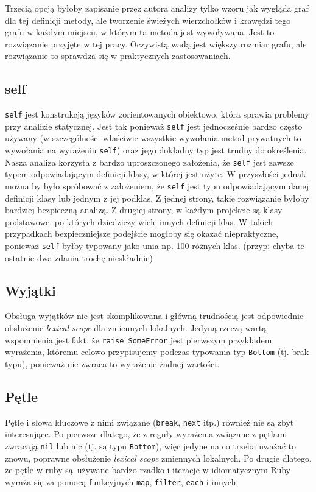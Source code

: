 \documentclass[declaration,shortabstract]{iithesis}
\begin{document}
Trzecią opcją byłoby zapisanie przez autora analizy tylko wzoru jak wygląda graf dla tej definicji metody, ale tworzenie świeżych wierzchołków i krawędzi tego grafu w każdym miejscu, w którym ta metoda jest wywoływana. Jest to rozwiązanie przyjęte w tej pracy. Oczywistą wadą jest większy rozmiar grafu, ale rozwiązanie to sprawdza się w praktycznych zastosowaniach.

\subsection{self}

\texttt{self} jest konstrukcją języków zorientowanych obiektowo, która sprawia problemy przy analizie statycznej.
Jest tak ponieważ \texttt{self} jest jednocześnie bardzo często używany (w szczególności właściwie wszystkie wywołania metod prywatnych to wywołania na wyrażeniu \texttt{self}) oraz jego dokładny typ jest trudny do określenia. Nasza analiza korzysta z bardzo uproszczonego założenia, że \texttt{self} jest zawsze typem odpowiadającym definicji klasy, w której jest użyte. W przyszłości jednak można by było spróbować z założeniem, że \texttt{self} jest typu odpowiadającym danej definicji klasy lub jednym z jej podklas. Z jednej strony, takie rozwiązanie byłoby bardziej bezpieczną analizą. Z drugiej strony, w każdym projekcie są klasy podstawowe, po których dziedziczy wiele innych definicji klas. W takich przypadkach bezpieczniejsze podejście mogłoby się okazać niepraktyczne, ponieważ \texttt{self} byłby typowany jako unia np. 100 różnych klas. (przyp: chyba te ostatnie dwa zdania trochę nieskładnie)

\subsection{Wyjątki}

Obsługa wyjątków nie jest skomplikowana i główną trudnością jest odpowiednie obsłużenie \textit{lexical scope} dla zmiennych lokalnych. Jedyną rzeczą wartą wspomnienia jest fakt, że \texttt{raise SomeError} jest pierwszym przykładem wyrażenia, któremu celowo przypisujemy podczas typowania typ \texttt{Bottom} (tj. brak typu), ponieważ nie zwraca to wyrażenie żadnej wartości.

\subsection{Pętle}

Pętle i słowa kluczowe z nimi związane (\texttt{break}, \texttt{next} itp.) również nie są zbyt interesujące. Po pierwsze dlatego, że z reguły wyrażenia związane z pętlami zwracają \texttt{nil} lub nic (tj. są typu \texttt{Bottom}), więc jedyne na co trzeba uważać to znowu, poprawne obsłużenie \textit{lexical scope} zmiennych lokalnych. Po drugie dlatego, że pętle w ruby są używane bardzo rzadko i iteracje w idiomatycznym Ruby wyraża się za pomocą funkcyjnych \texttt{map}, \texttt{filter}, \texttt{each} i innych.
\end{document}
